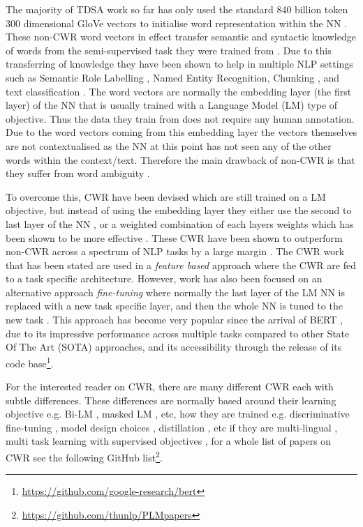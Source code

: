 The majority of TDSA work so far has only used the standard 840 billion token 300 dimensional GloVe vectors \citep{pennington-etal-2014-glove} to initialise word representation within the NN \citep{tang-etal-2016-aspect,tang-etal-2019-progressive}. These non-CWR word vectors in effect transfer semantic and syntactic knowledge of words from the semi-supervised task they were trained from \citep{mikolov2013efficient}. Due to this transferring of knowledge they have been shown to help in multiple NLP settings such as Semantic Role Labelling \citep{collobert2008unified}, Named Entity Recognition, Chunking \citep{turian-etal-2010-word}, and text classification \citep{kim-2014-convolutional}. The word vectors are normally the embedding layer (the first layer) of the NN that is usually trained with a Language Model (LM) type of objective. Thus the data they train from does not require any human annotation. Due to the word vectors coming from this embedding layer the vectors themselves are not contextualised as the NN at this point has not seen any of the other words within the context/text. Therefore the main drawback of non-CWR is that they suffer from word ambiguity \citep{camacho2018word}. 

To overcome this, CWR have been devised which are still trained on a LM objective, but instead of using the embedding layer they either use the second to last layer of the NN \citep{peters-etal-2017-semi}, or a weighted combination of each layers weights which has been shown to be more effective \citep{peters-etal-2018-deep}. These CWR have been shown to outperform non-CWR across a spectrum of NLP tasks by a large margin \citep{liu-etal-2019-linguistic}. The CWR work that has been stated are used in a \textit{feature based} approach where the CWR are fed to a task specific architecture. However, work has also been focused on an alternative approach \textit{fine-tuning} where normally the last layer of the LM NN is replaced with a new task specific layer, and then the whole NN is tuned to the new task \citep{radford2018improving, howard-ruder-2018-universal}. This approach has become very popular since the arrival of BERT \citep{devlin-etal-2019-bert}, due to its impressive performance across multiple tasks compared to other State Of The Art (SOTA) approaches, and its accessibility through the release of its code base\footnote{\url{https://github.com/google-research/bert}}. 

For the interested reader on CWR, there are many different CWR each with subtle differences. These differences are normally based around their learning objective e.g. Bi-LM \citep{peters-etal-2018-deep}, masked LM \citep{devlin-etal-2019-bert}, etc, how they are trained e.g. discriminative fine-tuning \citep{howard-ruder-2018-universal}, model design choices \citep{liu2019roberta}, distillation \citep{tsai-etal-2019-small}, etc if they are multi-lingual \citep{conneau2019cross}, multi task learning with supervised objectives \citep{liu-etal-2019-multi}, for a whole list of papers on CWR see the following GitHub list\footnote{\url{https://github.com/thunlp/PLMpapers}}.

